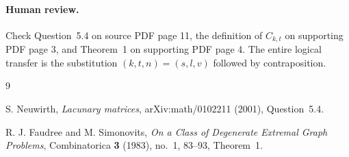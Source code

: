 \documentclass[11pt]{article}
\begin{document}
\paragraph{Human review.}
Check Question~5.4 on source PDF page 11, the definition of $C_{k,t}$ on
supporting PDF page 3, and Theorem~1 on supporting PDF page 4.  The entire
logical transfer is the substitution $(k,t,n)=(s,l,v)$ followed by
contraposition.

\begin{thebibliography}{9}
\raggedright
{}
S. Neuwirth,
\emph{Lacunary matrices}, arXiv:math/0102211 (2001), Question~5.4.

R. J. Faudree and M. Simonovits,
\emph{On a Class of Degenerate Extremal Graph Problems},
Combinatorica \textbf{3} (1983), no.~1, 83--93, Theorem~1.
\end{thebibliography}
\end{document}
